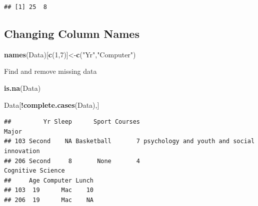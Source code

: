 \documentclass[
  openany]{book}
\newenvironment{Shaded}{\begin{snugshade}}{\end{snugshade}}
\newcommand{\DecValTok}[1]{\textcolor[rgb]{0.00,0.00,0.81}{#1}}
\newcommand{\FunctionTok}[1]{\textcolor[rgb]{0.13,0.29,0.53}{\textbf{#1}}}
\newcommand{\NormalTok}[1]{#1}
\newcommand{\OtherTok}[1]{\textcolor[rgb]{0.56,0.35,0.01}{#1}}
\newcommand{\SpecialCharTok}[1]{\textcolor[rgb]{0.81,0.36,0.00}{\textbf{#1}}}
\newcommand{\StringTok}[1]{\textcolor[rgb]{0.31,0.60,0.02}{#1}}
\begin{document}
\begin{verbatim}
## [1] 25  8
\end{verbatim}

\begin{Shaded}
\end{Shaded}

\subsection{Changing Column Names}\label{changing-column-names}

\begin{Shaded}
\begin{Highlighting}[]
\FunctionTok{names}\NormalTok{(Data)[}\FunctionTok{c}\NormalTok{(}\DecValTok{1}\NormalTok{,}\DecValTok{7}\NormalTok{)]}\OtherTok{\textless{}{-}}\FunctionTok{c}\NormalTok{(}\StringTok{"Yr"}\NormalTok{,}\StringTok{"Computer"}\NormalTok{)}
\end{Highlighting}
\end{Shaded}

Find and remove missing data

\begin{Shaded}
\begin{Highlighting}[]
\FunctionTok{is.na}\NormalTok{(Data)}
\end{Highlighting}
\end{Shaded}

\begin{Shaded}
\begin{Highlighting}[]
\NormalTok{Data[}\SpecialCharTok{!}\FunctionTok{complete.cases}\NormalTok{(Data),]}
\end{Highlighting}
\end{Shaded}

\begin{verbatim}
##         Yr Sleep      Sport Courses                                      Major
## 103 Second    NA Basketball       7 psychology and youth and social innovation
## 206 Second     8       None       4                          Cognitive Science
##     Age Computer Lunch
## 103  19      Mac    10
## 206  19      Mac    NA
\end{verbatim}
\end{document}
